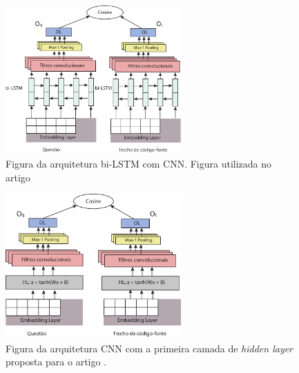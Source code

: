 \begin{figure}[h]
    \centering
    \includegraphics[width=0.6\textwidth]{figuras/cap-resultados-preliminares/ArquiteturaBiLSTM.pdf}
    \caption{Figura da arquitetura bi-LSTM com CNN. Figura utilizada no artigo \cite{marcelo-vem-2019}}
    \label{fig:arquitetura-bi-lstm-com-cnn}
\end{figure}

\begin{figure}[h]
    \centering
    \includegraphics[width=0.6\textwidth]{figuras/cap-resultados-preliminares/ArquiteturaCNN.pdf}
    \caption{Figura da arquitetura CNN com a primeira camada de \textit{hidden layer} proposta para o artigo \cite{marcelo-vem-2019}.}
    \label{fig:arquitetura-cnn}
\end{figure}


